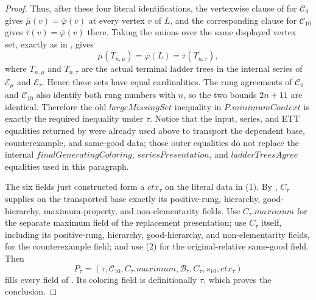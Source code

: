 \begin{proof}
Thus, after these four literal identifications, the vertexwise clause of
 for \(\mathcal C_0\) gives
\(\overline\mu(v)=\overline\varphi(v)\) at every vertex \(v\) of \(L\),
and the corresponding clause for \(\mathcal C_{10}\) gives
\(\overline\tau(v)=\overline\varphi(v)\) there.  Taking the unions over the
same displayed vertex set, exactly as in , gives
\[
 \overline\mu(T_{n,\mu})=\overline\varphi(L)
   =\overline\tau(T_{n,\tau}),
\]
where \(T_{n,\mu}\) and \(T_{n,\tau}\) are the actual terminal ladder
trees in the internal series of \(\mathcal E_\mu\) and
\(\mathcal E_\tau\).  Hence these sets have equal cardinalities.  The rung
agreements of \(\mathcal C_0\) and \(\mathcal C_{10}\) also identify both
rung numbers with \(n\), so the two bounds \(2n+11\) are identical.
Therefore the old \(\mathit{largeMissingSet}\) inequality in
\(P.\mathit{minimumContext}\) is exactly the required inequality under
\(\tau\).  Notice that the input, series, and ETT equalities returned by
 were already used above
to transport the dependent base, counterexample, and same-good data; those
outer equalities do not replace the internal
\(\mathit{finalGeneratingColoring}\), \(\mathit{seriesPresentation}\), and
\(\mathit{ladderTreesAgree}\) equalities used in this paragraph.

The six fields just constructed form a
 \(\mathit{ctx}_\tau\)
on the literal data in (1).  By
, \(C_\tau\) supplies on the transported
base exactly its positive-rung, hierarchy, good-hierarchy, maximum-property,
and non-elementarity fields.  Use \(C_\tau.\mathit{maximum}\) for the
separate maximum field of the replacement presentation; use \(C_\tau\)
itself, including its positive-rung, hierarchy, good-hierarchy, and
non-elementarity fields, for the counterexample field; and use (2) for the
original-relative same-good field.  Then
\[
 P_\tau=(\tau,\mathcal C_{10},C_\tau.\mathit{maximum},
          \mathcal B_\tau,C_\tau,s_{10},\mathit{ctx}_\tau)
\]
fills every field of .  Its
coloring field is definitionally \(\tau\), which proves the conclusion.
\end{proof}
